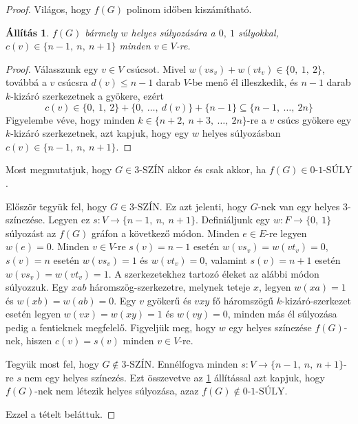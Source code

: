 \documentclass[12pt, a4paper]{report}
\newtheorem{áll}[tét]{Állítás}
\theoremstyle{remark}
\theoremstyle{definition}
\begin{document}
\begin{proof}
Világos, hogy $f(G)$ polinom időben kiszámítható.

\begin{áll} \label{pro:npreduct01}
$f(G)$ bármely $w$ helyes súlyozására a $0,\ 1$ súlyokkal, $c(v) \in \lbrace n - 1,\ n,\ n + 1 \rbrace$ minden $v \in V$-re.
\end{áll}

\begin{proof}
Válasszunk egy $v \in V$ csúcsot. Mivel $w(vs_v) + w(vt_v) \in \lbrace 0,\ 1,\ 2 \rbrace$, továbbá a $v$ csúcsra $d(v) \leq n - 1$ darab $V$-be menő él illeszkedik, és $n - 1$ darab $k$-kizáró szerkezetnek a gyökere, ezért
\begin{equation*}
c(v) \in \lbrace 0,\ 1,\ 2 \rbrace + \lbrace 0,\ \ldots,\ d(v) \rbrace + \lbrace n - 1 \rbrace \subseteq \lbrace n - 1,\ \ldots,\ 2n \rbrace
\end{equation*}
Figyelembe véve, hogy minden $k \in \lbrace n + 2,\ n + 3,\ \ldots,\ 2n \rbrace$-re a $v$ csúcs gyökere egy $k$-kizáró szerkezetnek, azt kapjuk, hogy egy $w$ helyes súlyozásban $c(v) \in \lbrace n - 1,\ n,\ n + 1 \rbrace$.
\end{proof}

Most megmutatjuk, hogy $G \in \textrm{3-SZÍN}$ akkor és csak akkor, ha $f(G) \in \textrm{0-1-SÚLY}$.

Először tegyük fel, hogy $G \in \textrm{3-SZÍN}$. Ez azt jelenti, hogy $G$-nek van egy helyes $3$-színezése. Legyen ez $s: V \rightarrow \lbrace n - 1,\ n,\ n + 1 \rbrace$. Definiáljunk egy $w: F \rightarrow \lbrace 0,\ 1 \rbrace$ súlyozást az $f(G)$ gráfon a következő módon. Minden $e \in E$-re legyen $w(e) = 0$. Minden $v \in V$-re $s(v) = n - 1$ esetén $w(vs_v) = w(vt_v) = 0$, $s(v) = n$ esetén $w(vs_v) = 1$ és $w(vt_v) = 0$, valamint $s(v) = n + 1$ esetén $w(vs_v) = w(vt_v) = 1$. A szerkezetekhez tartozó éleket az alábbi módon súlyozzuk. Egy $xab$ háromszög-szerkezetre, melynek teteje $x$, legyen $w(xa) = 1$ és $w(xb) = w(ab) = 0$. Egy $v$ gyökerű és $vxy$ fő háromszögű $k$-kizáró-szerkezet esetén legyen $w(vx) = w(xy) = 1$ és $w(vy) = 0$, minden más él súlyozása pedig a fentieknek megfelelő. Figyeljük meg, hogy $w$ egy helyes színezése $f(G)$-nek, hiszen $c(v) = s(v)$ minden $v \in V$-re.

Tegyük most fel, hogy $G \notin \textrm{3-SZÍN}$. Ennélfogva minden $s: V \rightarrow \lbrace n - 1,\ n,\ n + 1 \rbrace$-re $s$ nem egy helyes színezés. Ezt összevetve az \ref{pro:npreduct01} állítással azt kapjuk, hogy $f(G)$-nek nem létezik helyes súlyozása, azaz $f(G) \notin \textrm{0-1-SÚLY}$.

Ezzel a tételt beláttuk.
\end{proof}
\end{document}

